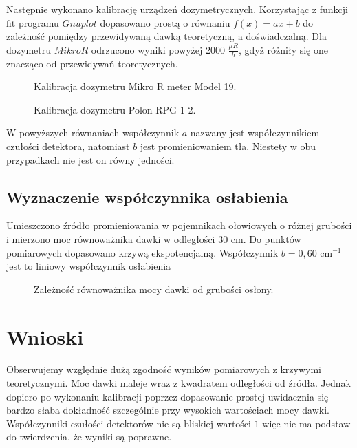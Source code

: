 \documentclass{article}
\begin{document}
Następnie wykonano kalibrację urządzeń dozymetrycznych. Korzystając z funkcji fit programu $Gnuplot$ dopasowano prostą o równaniu $f(x) = ax + b$ do zależność pomiędzy przewidywaną dawką teoretyczną, a doświadczalną. 
Dla dozymetru $Mikro R$ odrzucono wyniki powyżej 2000 $\frac{\mu R}{h}$, gdyż różniły się one znacząco od przewidywań teoretycznych.

\begin{figure}[h!]
	\centering	
	\fontsize{8}{12}\selectfont %
	\resizebox{0.7\textwidth}{!}{}		
	\caption{Kalibracja dozymetru Mikro R meter Model 19.}
	\label{model_kalibracja}
\end{figure}

\begin{figure}[h!]
	\centering	
	\fontsize{8}{12}\selectfont %
	\resizebox{0.7\textwidth}{!}{}		
	\caption{Kalibracja dozymetru Polon RPG 1-2.}
	\label{polon_kalibracja}
\end{figure}


W powyższych równaniach współczynnik $a$ nazwany jest współczynnikiem czułości detektora, natomiast $b$ jest promieniowaniem tła. Niestety w obu przypadkach nie jest on równy jedności. 

\subsection{Wyznaczenie współczynnika osłabienia}
Umieszczono źródło promieniowania w pojemnikach ołowiowych o różnej grubości i mierzono moc równoważnika dawki w odległości 30 cm. Do punktów pomiarowych dopasowano krzywą ekspotencjalną. Współczynnik $b = 0,60$ cm$^{-1}$ jest to liniowy współczynnik osłabienia
\begin{figure}[h!]
	\centering	
	\fontsize{8}{12}\selectfont %
	\resizebox{0.7\textwidth}{!}{}		
	\caption{Zależność równoważnika mocy dawki od grubości osłony.}
	\label{oslona}
\end{figure}
\section{Wnioski}
Obserwujemy względnie dużą zgodność wyników pomiarowych z krzywymi teoretycznymi. Moc dawki maleje wraz z kwadratem odległości od źródła. Jednak dopiero po wykonaniu kalibracji poprzez dopasowanie prostej uwidacznia się bardzo słaba dokładność szczególnie przy wysokich wartościach mocy dawki. Współczynniki czułości detektorów nie są bliskiej wartości $1$ więc nie ma podstaw do twierdzenia, że wyniki są poprawne.    
\end{document}
